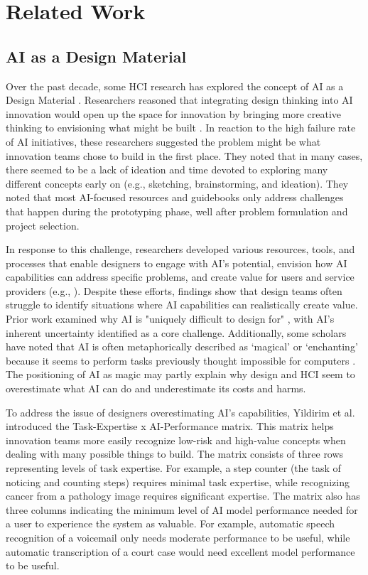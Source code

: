 \section{Related Work}
\subsection{AI as a Design Material}\label{subsec:AI_designmaterial}
Over the past decade, some HCI research has explored the concept of AI as a Design Material \cite{dove2017ux, holmquist2017intelligence, yildirim2022experienced, benjamin2021machine}. Researchers reasoned that integrating design thinking into AI innovation would open up the space for innovation by bringing more creative thinking to envisioning what might be built \cite{dove2017ux}. In reaction to the high failure rate of AI initiatives, these researchers suggested the problem might be what innovation teams chose to build in the first place. They noted that in many cases, there seemed to be a lack of ideation and time devoted to exploring many different concepts early on (e.g., sketching, brainstorming, and ideation). They noted that most AI-focused resources and guidebooks only address challenges that happen during the prototyping phase, well after problem formulation and project selection.

In response to this challenge, researchers developed various resources, tools, and processes that enable designers to engage with AI’s potential, envision how AI capabilities can address specific problems, and create value for users and service providers (e.g., \cite{fiebrink2010wekinator, yildirim2023creating, jansen2023mix}). Despite these efforts, findings show that design teams often struggle to identify situations where AI capabilities can realistically create value. Prior work examined why AI is "uniquely difficult to design for" \cite{yang2020re}, with AI’s inherent uncertainty identified as a core challenge. Additionally, some scholars have noted that AI is often metaphorically described as `magical' or `enchanting' because it seems to perform tasks previously thought impossible for computers \cite{lupetti2024making}. The positioning of AI as magic may partly explain why design and HCI seem to overestimate what AI can do and underestimate its costs and harms.

To address the issue of designers overestimating AI's capabilities, Yildirim et al. \cite{yildirim2023creating} introduced the Task-Expertise x AI-Performance matrix. This matrix helps innovation teams more easily recognize low-risk and high-value concepts when dealing with many possible things to build. The matrix consists of three rows representing levels of task expertise. %
For example, a step counter (the task of noticing and counting steps) requires minimal task expertise, while recognizing cancer from a pathology image requires significant expertise. The matrix also has three columns indicating the minimum level of AI model performance needed for a user to experience the system as valuable. For example, automatic speech recognition of a voicemail only needs moderate performance to be useful, while automatic transcription of a court case would need excellent model performance to be useful. 

